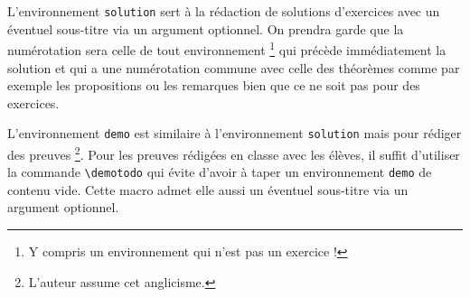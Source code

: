 L'environnement \verb+solution+ sert à la rédaction de solutions d'exercices avec un éventuel sous-titre via un argument optionnel. On prendra garde que la numérotation sera celle de tout environnement
\footnote{
	Y compris un environnement qui n'est pas un exercice !
}
qui précède immédiatement la solution et qui a une numérotation commune avec celle des théorèmes comme par exemple les propositions ou les remarques bien que ce ne soit pas pour des exercices.


\medskip


L'environnement \verb+demo+ est similaire à l'environnement \verb+solution+ mais pour rédiger des preuves
\footnote{
	L'auteur assume cet anglicisme.
}.
Pour les preuves rédigées en classe avec les élèves, il suffit d'utiliser la commande \verb+\demotodo+ qui évite d'avoir à taper un environnement \verb+demo+ de contenu vide. Cette macro admet elle aussi un éventuel sous-titre via un argument optionnel.